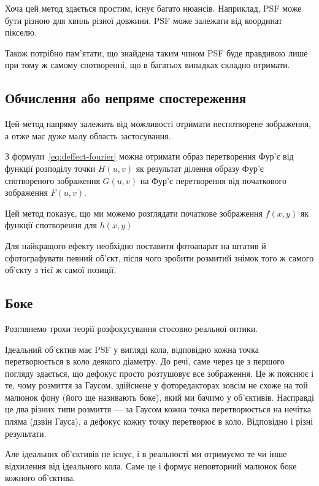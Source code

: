 \documentclass{diploma}
\begin{document}
      Хоча цей метод здається простим, існує багато нюансів.
      Наприклад, PSF може бути різною для хвиль різної довжини.
      PSF може залежати від координат пікселю.

      Також потрібно пам’ятати, що знайдена таким чином PSF буде правдивою
      лише при тому ж самому спотворенні, що в багатьох випадках складно
      отримати.
      \clearpage
    \subsection{Обчислення або непряме спостереження}
      Цей метод напряму залежить від можливості отримати неспотворене
      зображення, а отже має дуже малу область застосування.

      З формули~\eqref{eq:deffect-fourier} можна отримати образ перетворення
      Фур’є від функції розподілу точки $H\left( u, v \right)$ як результат
      ділення образу Фур’є спотвореного зображення $G\left( u, v \right)$ на
      Фур’є перетворення від початкового зображення $F\left( u, v \right)$.

      Цей метод показує, що ми можемо розглядати початкове зображення $f\left(
      x, y \right)$ як функції спотворення для $h\left( x, y \right)$

      Для найкращого ефекту необхідно поставити фотоапарат на штатив й
      сфотографувати певний об’єкт, після чого зробити розмитий знімок того ж
      самого об’єкту з тієї ж самої позиції.
      \clearpage
    \subsection{Боке}
      Розглянемо трохи теорії розфокусування стосовно реальної оптики.

      Ідеальний об’єктив має PSF у вигляді кола, відповідно кожна точка
      перетворюється в коло деякого діаметру.
      До речі, саме через це з першого погляду здається, що дефокус просто
      розтушовує все зображення.
      Це ж пояснює і те, чому розмиття за Гаусом, здійснене у фоторедакторах
      зовсім не схоже на той малюнок фону (його ще називають боке), який
      ми бачимо у об’єктивів.
      Насправді це два різних типи розмиття --- за Гаусом кожна точка
      перетворюється на нечітка пляма (дзвін Гауса), а дефокус кожну точку
      перетворює в коло.
      Відповідно і різні результати.

      Але ідеальних об’єктивів не існує, і в реальності ми отримуємо те чи інше
      відхилення від ідеального кола.
      Саме це і формує неповторний малюнок боке кожного об’єктива.
\end{document}
